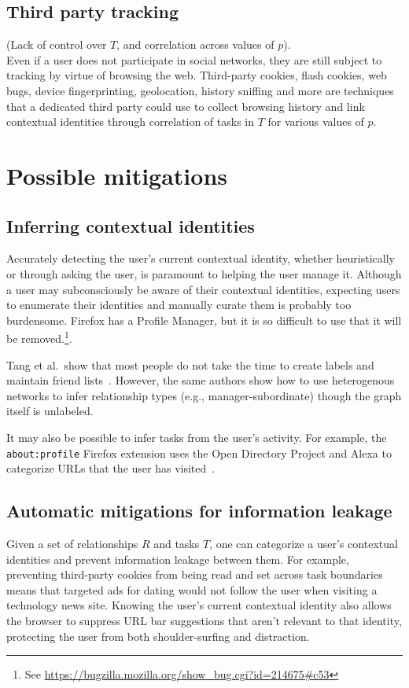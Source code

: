 \documentclass{llncs}
\begin{document}
\subsection{Third party tracking}
\label{sec:tracking}
(Lack of control over $T$, and correlation across values of $p$).\\
Even if a user does not participate in social networks, they are still subject
to tracking by virtue of browsing the web. Third-party cookies, flash cookies,
web bugs, device fingerprinting, geolocation, history sniffing and more are
techniques that a dedicated third party could use to collect browsing history
and link contextual identities through correlation of tasks in $T$ for various
values of $p$.

\section{Possible mitigations}

\subsection{Inferring contextual identities}
Accurately detecting the user's current contextual identity, whether
heuristically or through asking the user, is paramount to helping the user
manage it.
Although a user may subconsciously be aware of their contextual identities,
expecting users to enumerate their identities and manually curate them is
probably too burdensome. Firefox has a Profile Manager, but it is so difficult to use that it will be removed.\footnote{See \url{https://bugzilla.mozilla.org/show\_bug.cgi?id=214675\#c53}}.

Tang et al.~show that most people do not take the time to create labels and
maintain friend lists~\cite{tang}. However, the same authors show how to use
heterogenous networks to infer relationship types (e.g., manager-subordinate)
though the graph itself is unlabeled.

It may also be possible to infer tasks from the user's activity. For example,
the \texttt{about:profile} Firefox extension uses the Open Directory Project
and Alexa to categorize URLs that the user has visited~\cite{aboutprofile}.

\subsection{Automatic mitigations for information leakage}
Given a set of relationships $R$ and tasks $T$, one can categorize a user's
contextual identities and prevent information leakage between them.  For
example, preventing third-party cookies from being read and set across task
boundaries means that targeted ads for dating would not follow the user when
visiting a technology news site. Knowing the user's current contextual identity
also allows the browser to suppress URL bar suggestions that aren't relevant to
that identity, protecting the user from both shoulder-surfing and distraction.
\end{document}

